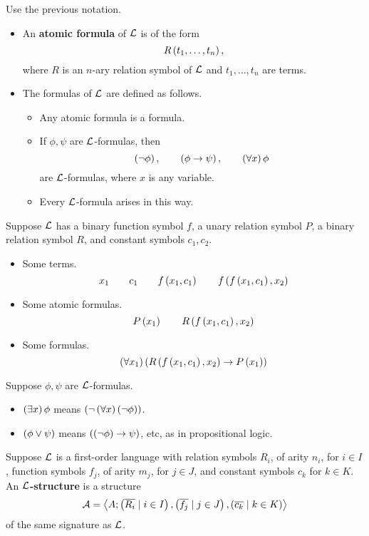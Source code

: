 
\begin{definition}
Use the previous notation.
\begin{itemize}
\item An \textbf{atomic formula} of $ \mathcal{L} $ is of the form
$$ R\left( t_1, \dots, t_n \right), $$
where $ R $ is an $ n $-ary relation symbol of $ \mathcal{L} $ and $ t_1, \dots, t_n $ are terms.
\item The formulas of $ \mathcal{L} $ are defined as follows.
\begin{itemize}
\item Any atomic formula is a formula.
\item If $ \phi, \psi $ are $ \mathcal{L} $-formulas, then
$$ \left( \neg \phi \right), \qquad \left( \phi \rightarrow \psi \right), \qquad \left( \forall x \right)\phi $$
are $ \mathcal{L} $-formulas, where $ x $ is any variable.
\item Every $ \mathcal{L} $-formula arises in this way.
\end{itemize}
\end{itemize}
\end{definition}

\begin{example2}
Suppose $ \mathcal{L} $ has a binary function symbol $ f $, a unary relation symbol $ P $, a binary relation symbol $ R $, and constant symbols $ c_1, c_2 $.
\begin{itemize}
\item Some terms.
$$ x_1 \qquad c_1 \qquad f\left( x_1, c_1 \right) \qquad f\left( f\left( x_1, c_1 \right), x_2 \right) $$
\item Some atomic formulas.
$$ P\left( x_1 \right) \qquad R\left( f\left( x_1, c_1 \right), x_2 \right) $$
\item Some formulas.
$$ \left( \forall x_1 \right)\left( R\left( f\left( x_1, c_1 \right), x_2 \right) \rightarrow P\left( x_1 \right) \right) $$
\end{itemize}
\end{example2}

\begin{definition}
Suppose $ \phi, \psi $ are $ \mathcal{L} $-formulas.
\begin{itemize}
\item $ \left( \exists x \right)\phi $ means $ \left( \neg \left( \forall x \right)\left( \neg \phi \right) \right) $.
\item $ \left( \phi \lor \psi \right) $ means $ \left( \left( \neg \phi \right) \rightarrow \psi \right) $, etc, as in propositional logic.
\end{itemize}
\end{definition}

\pagebreak

\begin{definition}
Suppose $ \mathcal{L} $ is a first-order language with relation symbols $ R_i $, of arity $ n_i $, for $ i \in I $, function symbols $ f_j $, of arity $ m_j $, for $ j \in J $, and constant symbols $ c_k $ for $ k \in K $. An \textbf{$ \mathcal{L} $-structure} is a structure
$$ \mathcal{A} = \left\langle A; \left( \overline{R_i} \mid i \in I \right), \left( \overline{f_j} \mid j \in J \right), \left( \overline{c_k} \mid k \in K \right) \right\rangle $$
of the same signature as $ \mathcal{L} $.
\end{definition}

